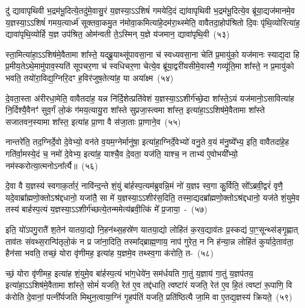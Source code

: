 दु॑ द्यावापृथिवी भ॒द्रम॑भू॒दित्ये॒तदु॑मे॒वासु॒रं य॒ज्ञस्या॒\-ऽऽ\-शिषं॑ गमयेदि॒दं द्या॑वापृथिवी भ॒द्रम॑भू॒दित्ये॒व ब्रू॑या॒द्यज॑मानमे॒व य॒ज्ञस्या॒\-ऽऽ\-शिषं॑ गमय॒त्यार्ध्म॑ सूक्तवा॒कमु॒त न॑मोवा॒कमित्या॑\-हे॒दम॑रा॒थ्स्मेति॒ वावैतदा॒होप॑श्रितो दि॒वः पृ॑थि॒व्योरित्या॑ह॒ द्यावा॑पृथि॒व्योर्\mbox{}हि य॒ज्ञ उप॑श्रित॒ ओम॑न्वती ते॒\-ऽस्मिन् य॒ज्ञे य॑जमान॒ द्यावा॑पृथि॒वी~(५३)

स्ता॒मित्या॑हा॒\-ऽऽ\-शिष॑मे॒वैतामा शा᳚स्ते॒ यद्ब्रू॒याथ्सू॑पावसा॒ना च॑ स्वध्यवसा॒ना चेति॑ प्र॒मायु॑को॒ यज॑मानः स्याद्य॒दा हि प्र॒मीय॒ते\-ऽथे॒मामु॑पाव॒स्यति॑ सूपचर॒णा च॑ स्वधिचर॒णा चेत्ये॒व ब्रू॑या॒द्वरी॑यसीमे॒वास्मै॒ गव्यू॑ति॒मा शा᳚स्ते॒ न प्र॒मायु॑को भवति॒ तयो॑रा॒विद्य॒ग्निरि॒दꣳ ह॒विर॑जुष॒तेत्या॑ह॒ या अया᳚क्ष्म~(५४)

दे॒वता॒स्ता अ॑रीरधा॒मेति॒ वावैतदा॑ह॒ यन्न नि॑र्दि॒शेत्प्रति॑वेशं य॒ज्ञस्या॒\-ऽऽ\-शीर्ग॑च्छे॒दा शा᳚स्ते॒\-ऽयं यज॑मानो॒\-ऽसावित्या॑ह नि॒र्दिश्यै॒वैनꣳ॑ सुव॒र्गं लो॒कं ग॑मय॒त्यायु॒रा शा᳚स्ते सुप्रजा॒स्त्वमा शा᳚स्त॒ इत्या॑हा॒\-ऽऽ\-शिष॑मे॒वैतामा शा᳚स्ते सजातवन॒स्यामा शा᳚स्त॒ इत्या॑ह प्रा॒णा वै स॑जा॒ताः प्रा॒णाने॒व~(५५)

नान्तरे॑ति॒ तद॒ग्निर्दे॒वो दे॒वेभ्यो॒ वन॑ते व॒यम॒ग्नेर्मानु॑षा॒ इत्या॑हा॒ग्निर्दे॒वेभ्यो॑ वनु॒ते व॒यं म॑नु॒ष्ये᳚भ्य॒ इति॒ वावैतदा॑हे॒ह गति॑र्वा॒मस्ये॒दं च॒ नमो॑ दे॒वेभ्य॒ इत्या॑ह॒ याश्चै॒व दे॒वता॒ यज॑ति॒ याश्च॒ न ताभ्य॑ ए॒वोभयी᳚भ्यो॒ नम॑स्करोत्या॒त्मनो\-ऽना᳚र्त्यै॥~(५६)

{\anuvakamend[{श्रि॒तस्ते॒ प्र त्रि॒ष्टुभ॑मे॒तद्द्यावा॑पृथि॒वी या अया᳚क्ष्म प्रा॒णाने॒व षट्च॑त्वारिꣳशच्च}]}%

दे॒वा वै य॒ज्ञस्य॑ स्वगाक॒र्तारं॒ नावि॑न्द॒न्ते शं॒युं बा॑र्\mbox{}हस्प॒त्य\-म॑ब्रुवन्नि॒मं नो॑ य॒ज्ञꣴ स्व॒गा कु॒र्विति॒ सो᳚\-ऽब्रवी॒द्वरं॑ वृणै॒ यदे॒वा\-ब्रा᳚ह्मणो॒क्तो\-ऽश्र॑द्दधानो॒ यजा॑तै॒ सा मे॑ य॒ज्ञस्या॒\-ऽऽ\-शीर॑स॒दिति॒ तस्मा॒द्यदब्रा᳚ह्मणो॒क्तो\-ऽश्र॑द्दधानो॒ यज॑ते शं॒युमे॒व तस्य॑ बार्\mbox{}हस्प॒त्यं य॒ज्ञस्या॒\-ऽऽ\-शीर्ग॑च्छ\-त्ये॒तन्ममेत्य॑ब्रवी॒त्किं मे᳚ प्र॒जाया॒~-~(५७)

इति॒ यो॑\-ऽपगु॒रातै॑ श॒तेन॑ यातया॒द्यो नि॒हन॑थ्स॒हस्रे॑ण यातया॒द्यो लोहि॑तं क॒रव॒द्याव॑तः प्र॒स्कद्य॑ पा॒ꣳ॒सून्थ्स॑ङ्गृ॒ह्णात् ताव॑तः संवथ्स॒रान्पि॑तृलो॒कं न प्र जा॑ना॒दिति॒ तस्मा᳚द्ब्राह्म॒णाय॒ नाप॑ गुरेत॒ न नि ह॑न्या॒न्न लोहि॑तं कुर्यादे॒ताव॑ता॒ हैन॑सा भवति॒ तच्छं॒ योरा वृ॑णीमह॒ इत्या॑ह य॒ज्ञमे॒व तथ्स्व॒गा क॑रोति॒ त-~(५८)

च्छं॒ योरा वृ॑णीमह॒ इत्या॑ह शं॒युमे॒व बा॑र्\mbox{}हस्प॒त्यं भा॑ग॒धेये॑न॒ सम॑र्धयति गा॒तुं य॒ज्ञाय॑ गा॒तुं य॒ज्ञप॑तय॒ इत्या॑हा॒\-ऽऽ\-शिष॑मे॒वैतामा शा᳚स्ते॒ सोमं॑ यजति॒ रेत॑ ए॒व तद्द॑धाति॒ त्वष्टा॑रं यजति॒ रेत॑ ए॒व हि॒तं त्वष्टा॑ रू॒पाणि॒ वि क॑रोति दे॒वानां॒ पत्नी᳚र्यजति मिथुन॒त्वाया॒ग्निं गृ॒हप॑तिं यजति॒ प्रति॑ष्ठित्यै जा॒मि वा ए॒तद्य॒ज्ञस्य॑ क्रियते॒~(५९)

